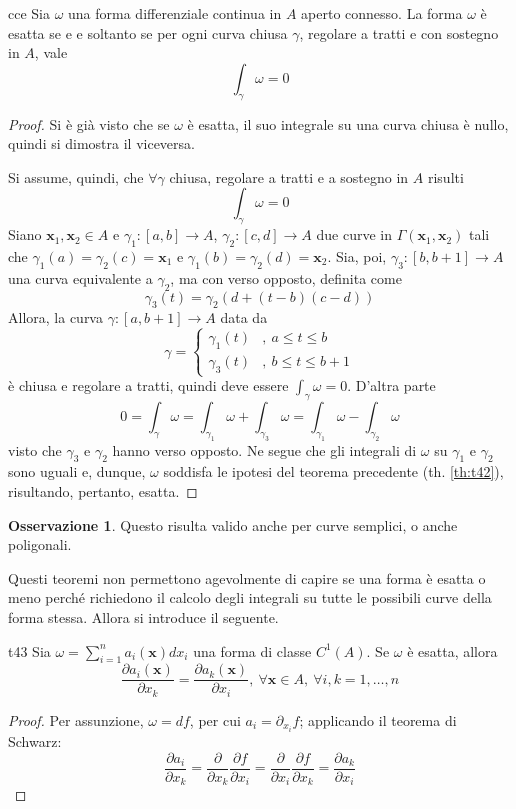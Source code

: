 \documentclass[11pt, a4paper]{scrartcl}
\theoremstyle{definition}
\numberwithin{esempio}{section}
\theoremstyle{definition}
\newtheorem{obs}{Osservazione}
\numberwithin{obs}{section}
\numberwithin{nota}{section}
\numberwithin{equation}{subsection}
\begin{document}
\begin{teorema}
	{}{cce}
	Sia $\omega$ una forma differenziale continua in $A$ aperto connesso.
	La forma $\omega$ \`e esatta se e e soltanto se per ogni curva chiusa $\gamma$, regolare a tratti e con sostegno in $A$, vale
	\[
	\int_{\gamma} \omega = 0 
	\] 
	\begin{proof}
		Si \`e gi\`a visto che se $\omega$ \`e esatta, il suo integrale su una curva chiusa \`e nullo, quindi si dimostra il viceversa.

		Si assume, quindi, che $ \forall \gamma$ chiusa, regolare a tratti e a sostegno in $A$ risulti
		\[
		\int_{\gamma} \omega = 0
		\] 
		Siano $\mathbf{x} _1, \mathbf{x} _2 \in A$ e $\gamma_1 :\left[ a,b \right] \to A$, $\gamma_2:\left[ c,d \right] \to A$ due curve in $\Gamma(\mathbf{x} _1,\mathbf{x} _2)$ tali che $\gamma_1(a) = \gamma_2(c)=\mathbf{x} _1$ e $\gamma_1(b) = \gamma_2(d) = \mathbf{x} _2$.
		Sia, poi, $\gamma_3:\left[ b,b+1 \right] \to A$ una curva equivalente a $\gamma_2$, ma con verso opposto, definita come
		\[
		\gamma_3(t) = \gamma_2(d+(t-b)(c-d))
		\] 
		Allora, la curva $\gamma:\left[ a,b+1 \right] \to A$ data da
		\[
		\gamma = \begin{cases}
			\gamma_1(t) &,\ a\le t\le b\\
			\gamma_3(t) &,\ b\le t\le b+1
		\end{cases}
		\] 
		\`e chiusa e regolare a tratti, quindi deve essere $\int_{\gamma} \omega = 0$. 
		D'altra parte
		\[
		0 = \int_{\gamma} \omega = \int_{\gamma_1} \omega + \int_{\gamma_3} \omega = \int_{\gamma_1} \omega - \int_{\gamma_2} \omega
		\] 
		visto che $\gamma_3$ e $\gamma_2$ hanno verso opposto.
		Ne segue che gli integrali di $\omega$ su $\gamma_1$ e $\gamma_2$ sono uguali e, dunque, $\omega$ soddisfa le ipotesi del teorema precedente (th. \ref{th:t42}), risultando, pertanto, esatta.
	\end{proof}
\end{teorema}
\begin{obs}\label{o42}
 Questo risulta valido anche per curve semplici, o anche poligonali.
\end{obs}
Questi teoremi non permettono agevolmente di capire se una forma \`e esatta o meno perch\'e richiedono il calcolo degli integrali su tutte le possibili curve della forma stessa.
Allora si introduce il seguente.
\begin{teorema}
	{}{t43}
	Sia $\omega = \sum_{i=1}^{n} a_i(\mathbf{x} ) dx_i$ una forma di classe $C^1(A)$. Se $\omega$ \`e esatta, allora 
	\[
	\frac{\partial a_i(\mathbf{x} )}{\partial x_k} = \frac{\partial a_k(\mathbf{x} )}{\partial x_i} , \ \forall \mathbf{x} \in A, \ \forall i,k=1,\ldots,n
	\] 
	\begin{proof}
		Per assunzione, $\omega = df$, per cui $a_i =  \partial _{x_i} f$; applicando il teorema di Schwarz:
		\[
		\frac{\partial a_i}{\partial x_k} = \frac{\partial }{\partial x_k} \frac{\partial f}{\partial x_i} = \frac{\partial }{\partial x_i} \frac{\partial f}{\partial x_k} = \frac{\partial a_k}{\partial x_i} 
		\] 
	\end{proof}
\end{teorema}
\end{document}
